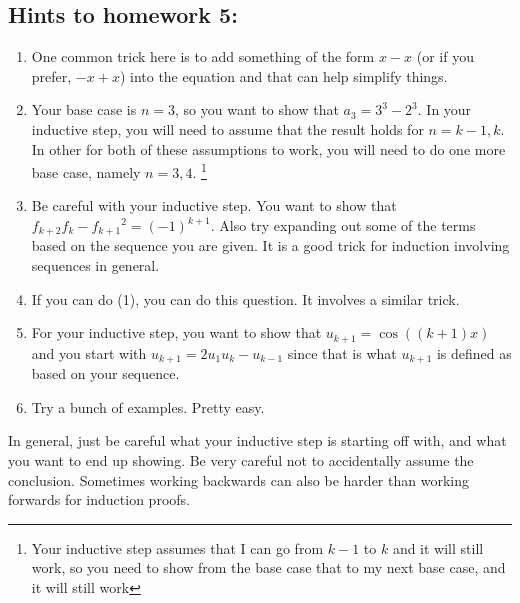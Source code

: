\documentclass[letterpaper,12pt]{article}
\begin{document}
\subsection*{Hints to homework 5:}
\begin{enumerate}
\item One common trick here is to add something of the form $x - x$ (or if you prefer, $-x + x$) into the equation and that can help simplify things.
\item Your base case is $n = 3$, so you want to show that $a_3 = 3^3 - 2^3$. In your inductive step, you will need to assume that the result holds for $n=k-1,k$. In other for both of these assumptions to work, you will need to do one more base case, namely $n=3,4$. \footnote{Your inductive step assumes that I can go from $k-1$ to $k$ and it will still work, so you need to show from the base case that to my next base case, and it will still work} 
\item Be careful with your inductive step. You want to show that $ f_{k+2}f_{k} - {f_{k+1}}^2 = (-1)^{k+1}$. Also try expanding out some of the terms based on the sequence you are given. It is a good trick for induction involving sequences in general.
\item If you can do (1), you can do this question. It involves a similar trick.
\item For your inductive step, you want to show that $u_{k+1} = \cos{((k+1) x)}$ and you start with $u_{k+1} = 2u_1u_{k} - u_{k-1}$ since that is what $u_{k+1}$ is defined as based on your sequence.
\item Try a bunch of examples. Pretty easy.
\end{enumerate}
In general, just be careful what your inductive step is starting off with, and what you want to end up showing. Be very careful not to accidentally assume the conclusion. Sometimes working backwards can also be harder than working forwards for induction proofs.
\end{document}
